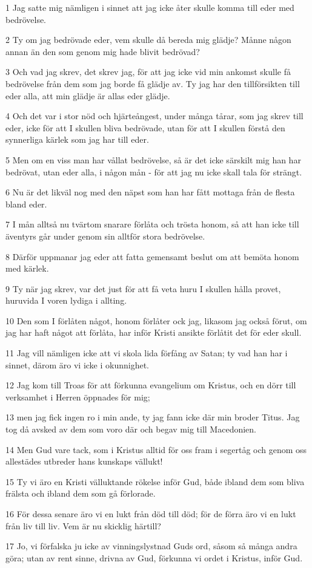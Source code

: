 \par 1 Jag satte mig nämligen i sinnet att jag icke åter skulle komma till eder med bedrövelse.
\par 2 Ty om jag bedrövade eder, vem skulle då bereda mig glädje? Månne någon annan än den som genom mig hade blivit bedrövad?
\par 3 Och vad jag skrev, det skrev jag, för att jag icke vid min ankomst skulle få bedrövelse från dem som jag borde få glädje av. Ty jag har den tillförsikten till eder alla, att min glädje är allas eder glädje.
\par 4 Och det var i stor nöd och hjärteångest, under många tårar, som jag skrev till eder, icke för att I skullen bliva bedrövade, utan för att I skullen förstå den synnerliga kärlek som jag har till eder.
\par 5 Men om en viss man har vållat bedrövelse, så är det icke särskilt mig han har bedrövat, utan eder alla, i någon mån - för att jag nu icke skall tala för strängt.
\par 6 Nu är det likväl nog med den näpst som han har fått mottaga från de flesta bland eder.
\par 7 I mån alltså nu tvärtom snarare förlåta och trösta honom, så att han icke till äventyrs går under genom sin alltför stora bedrövelse.
\par 8 Därför uppmanar jag eder att fatta gemensamt beslut om att bemöta honom med kärlek.
\par 9 Ty när jag skrev, var det just för att få veta huru I skullen hålla provet, huruvida I voren lydiga i allting.
\par 10 Den som I förlåten något, honom förlåter ock jag, likasom jag också förut, om jag har haft något att förlåta, har inför Kristi ansikte förlåtit det för eder skull.
\par 11 Jag vill nämligen icke att vi skola lida förfång av Satan; ty vad han har i sinnet, därom äro vi icke i okunnighet.
\par 12 Jag kom till Troas för att förkunna evangelium om Kristus, och en dörr till verksamhet i Herren öppnades för mig;
\par 13 men jag fick ingen ro i min ande, ty jag fann icke där min broder Titus. Jag tog då avsked av dem som voro där och begav mig till Macedonien.
\par 14 Men Gud vare tack, som i Kristus alltid för oss fram i segertåg och genom oss allestädes utbreder hans kunskaps vällukt!
\par 15 Ty vi äro en Kristi välluktande rökelse inför Gud, både ibland dem som bliva frälsta och ibland dem som gå förlorade.
\par 16 För dessa senare äro vi en lukt från död till död; för de förra äro vi en lukt från liv till liv. Vem är nu skicklig härtill?
\par 17 Jo, vi förfalska ju icke av vinningslystnad Guds ord, såsom så många andra göra; utan av rent sinne, drivna av Gud, förkunna vi ordet i Kristus, inför Gud.

